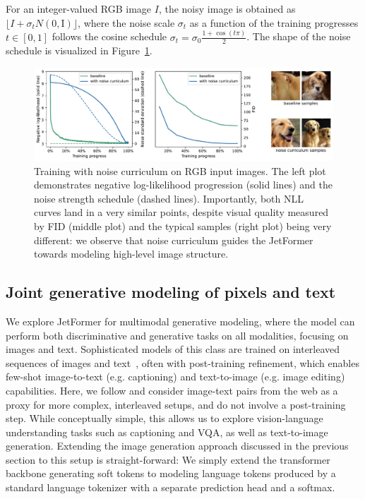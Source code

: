 \documentclass{article} %
\begin{document}
For an integer-valued RGB image $I$, the noisy image is obtained as $\lfloor I + \sigma_t N(0, \mathrm{I}) \rfloor$, where the noise scale $\sigma_t$ as a function of the training progresses $t \in [0, 1]$ follows the cosine schedule ${\sigma_t = \sigma_0 \tfrac{1+\cos(t \pi)}{2}}$. The shape of the noise schedule is visualized in Figure~\ref{fig:noise_schedule}.

\begin{figure}
    \centering
    \includegraphics[width=1.0\textwidth]{figures/nll-noise.pdf}
    \caption{Training with noise curriculum on RGB input images. The left plot demonstrates negative log-likelihood progression (solid lines) and the noise strength schedule (dashed lines). Importantly, both NLL curves land in a very similar points, despite visual quality measured by FID (middle plot) and the typical samples (right plot) being very different: we observe that noise curriculum guides the JetFormer towards modeling high-level image structure.}
    \label{fig:noise_schedule}
\end{figure}

\subsection{Joint generative modeling of pixels and text} \label{sec:image_text}

We explore JetFormer for multimodal generative modeling, where the model can perform both discriminative and generative tasks on all modalities, focusing on images and text. Sophisticated models of this class are trained on interleaved sequences of images and text~\citep{aghajanyan2022cm3, kim2023magvlt, aghajanyan2023scaling}, often with post-training refinement, which enables few-shot image-to-text (e.g. captioning) and text-to-image (e.g. image editing) capabilities. Here, we follow \citep{kim2023magvlt, you2023cobit} and consider image-text pairs from the web as a proxy for more complex, interleaved setups, and do not involve a post-training step. While conceptually simple, this allows us to explore vision-language understanding tasks such as captioning and VQA, as well as text-to-image generation. Extending the image generation approach discussed in the previous section to this setup is straight-forward: We simply extend the transformer backbone generating soft tokens to modeling language tokens produced by a standard language tokenizer with a separate prediction head and a softmax.
\end{document}
